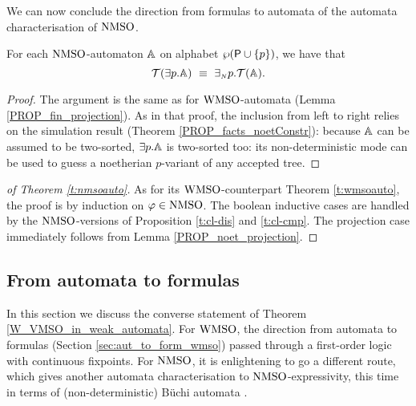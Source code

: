 We can now conclude the direction from formulas to automata of the automata characterisation of $\mathrm{NMSO}$.

\begin{lemma}\label{PROP_noet_projection}
For each $\mathrm{NMSO}$-automaton $\mathbb{A}$ on alphabet $\wp (\mathsf{P} \cup \{p\})$,
we have that
$$\mathcal{T}({{\exists} p}.\mathbb{A}) \ \equiv\
{{\exists_{{\scriptscriptstyle N}}} p}.\mathcal{T}(\mathbb{A}).
$$
\end{lemma}
\begin{proof} The argument is the same as for $\mathrm{WMSO}$-automata (Lemma \ref{PROP_fin_projection}). As in that proof, the inclusion from left to right relies on the simulation result (Theorem \ref{PROP_facts_noetConstr}): because $\mathbb{A}$ can be assumed to be two-sorted, ${{\exists} p}.\mathbb{A}$ is two-sorted too: its non-deterministic mode can be used to guess a noetherian $p$-variant of any accepted tree. \end{proof}

\begin{proof}[of Theorem \ref{t:nmsoauto}] As for its $\mathrm{WMSO}$-counterpart Theorem \ref{t:wmsoauto}, the proof is by induction on $\varphi \in \mathrm{NMSO}$. The boolean inductive cases are handled by the $\mathrm{NMSO}$-versions of Proposition \ref{t:cl-dis} and \ref{t:cl-cmp}. The projection case immediately follows from Lemma \ref{PROP_noet_projection}.
\end{proof} 

\subsection{From automata to formulas} \label{sec:aut_to_formulas_nmso}

In this section we discuss the converse statement of Theorem
\ref{W_VMSO_in_weak_automata}. For $\mathrm{WMSO}$, the direction from automata to formulas (Section \ref{sec:aut_to_form_wmso}) passed through a first-order logic with continuous fixpoints. For $\mathrm{NMSO}$, it is enlightening to go a different route, which gives another automata characterisation to $\mathrm{NMSO}$-expressivity, this time in terms of (non-deterministic) {B\"{u}chi automata} \cite{Rab70}. 

